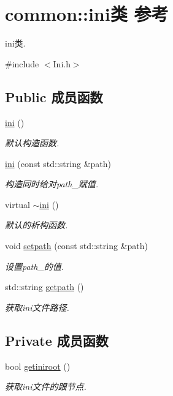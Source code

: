 \hypertarget{classcommon_1_1ini}{\section{common\+:\+:ini类 参考}
\label{classcommon_1_1ini}
}


ini类.  




{\ttfamily \#include $<$Ini.\+h$>$}

\subsection*{Public 成员函数}
\begin{DoxyCompactItemize}
\item 
\hyperlink{classcommon_1_1ini_a09ee5995bd6e8c0d9ed356fc9c07ea31}{ini} ()
\begin{DoxyCompactList}\small\item\em 默认构造函数. \end{DoxyCompactList}\item 
\hyperlink{classcommon_1_1ini_a99c9d789432be862a71b040e2e80176b}{ini} (const std\+::string \&path)
\begin{DoxyCompactList}\small\item\em 构造同时给对path\+\_\+赋值. \end{DoxyCompactList}\item 
virtual \hyperlink{classcommon_1_1ini_afbfb0b27b5737f11bdd67d87be8b9789}{$\sim$ini} ()
\begin{DoxyCompactList}\small\item\em 默认的析构函数. \end{DoxyCompactList}\item 
void \hyperlink{classcommon_1_1ini_a5c59d15623cc99a113ff87e837fbd60e}{setpath} (const std\+::string \&path)
\begin{DoxyCompactList}\small\item\em 设置path\+\_\+的值. \end{DoxyCompactList}\item 
std\+::string \hyperlink{classcommon_1_1ini_a6891dae2b2770a318d58b730ef43e707}{getpath} ()
\begin{DoxyCompactList}\small\item\em 获取ini文件路径. \end{DoxyCompactList}\end{DoxyCompactItemize}
\subsection*{Private 成员函数}
\begin{DoxyCompactItemize}
\item 
bool \hyperlink{classcommon_1_1ini_a80a19e11288c5f45b2cfae48859510b6}{getiniroot} ()
\begin{DoxyCompactList}\small\item\em 获取ini文件的跟节点. \end{DoxyCompactList}\end{DoxyCompactItemize}
